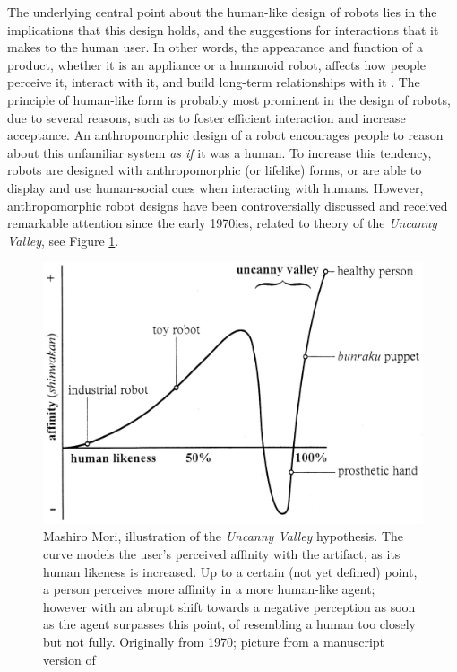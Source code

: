 \documentclass{frontiersSCNS} %
\begin{document}
The underlying central point about the human-like design of robots lies in the 
implications that this design holds, and the suggestions for interactions that
it makes to the human user. 
In other words, the appearance 
and function of a product, whether it is an appliance or a humanoid robot, affects how 
people perceive it, interact with it, and build long-term relationships with 
it \citep{bartneck_shaping_2004}. 
The principle of human-like form is probably most prominent in the design of robots, 
due to several reasons, such as to foster efficient interaction and increase 
acceptance. An anthropomorphic design of a robot encourages people to reason about this 
unfamiliar system \emph{as if} it was a human. To increase this tendency, robots are 
designed with anthropomorphic (or lifelike) forms, or are able to display and use 
human-social cues when interacting with humans.
However, anthropomorphic robot designs have been controversially discussed and received 
remarkable attention since the early 1970ies, related to \cite{mori_uncanny_1970} 
theory of the \textit{Uncanny Valley}, see Figure \ref{fig:uncanny_valley}.

\begin{figure}\centering
  \includegraphics[scale=0.75]{uncanny-valley.jpg}
 \caption{Mashiro Mori, illustration of the \textit{Uncanny Valley} hypothesis. The curve models the user's perceived affinity with the artifact, as its human likeness is increased. Up to a certain (not yet defined) point, a person perceives more affinity in a more human-like agent; however with an abrupt shift towards a negative perception as soon as the agent surpasses this point, of resembling a human too closely but not fully. Originally from 1970; picture from a manuscript version of \cite{mori_uncanny_2012}}
 \label{fig:uncanny_valley}       %
 \end{figure}
\end{document}
